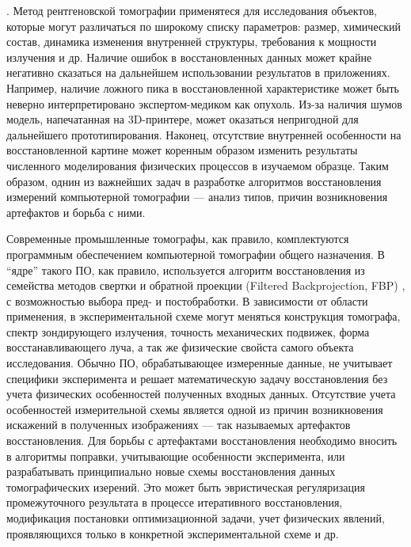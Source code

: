 {\actuality}. Метод рентгеновской томографии применятеся для исследования объектов, которые могут различаться по широкому списку параметров: размер, химический состав, динамика изменения внутренней структуры, требования к мощности излучения и др.
Наличие ошибок в восстановленных данных может крайне негативно сказаться на дальнейшем использовании результатов в приложениях.
Например, наличие ложного пика в восстановленной характеристике может быть неверно интерпретировано экспертом-медиком как опухоль.
Из-за наличия шумов модель, напечатанная на 3D-принтере, может оказаться непригодной для дальнейшего прототипирования.
Наконец, отсутствие внутренней особенности на восстановленной картине может коренным образом изменить результаты численного моделирования физических процессов в изучаемом образце.
Таким образом, однин из важнейших задач в разработке алгоритмов восстановления измерений компьютерной томографии --- анализ типов, причин возникновения артефактов и борьба с ними.

Современные промышленные томографы, как правило, комплектуются программным обеспечением компьютерной томографии общего назначения.
В ``ядре'' такого ПО, как правило, используется алгоритм восстановления из семейства методов свертки и обратной проекции (Filtered Backprojection, FBP) \cite{commercialCTemployFBP}, с возможностью выбора пред- и постобработки.
В зависимости от области применения, в экспериментальной схеме могут меняться конструкция томографа, спектр зондирующего излучения, точность механических подвижек, форма восстанавливающего луча, а так же физические свойста самого объекта исследования.
Обычно ПО, обрабатывающее измеренные данные, не учитывает специфики эксперимента и решает математическую задачу восстановления без учета физических особенностей полученных входных данных.
Отсутствие учета особенностей измерительной схемы является одной из причин возникновения искажений в полученных изображениях --- так называемых артефактов восстановления.
Для борьбы с артефактами восстановления необходимо вносить в алгоритмы поправки, учитывающие особенности эксперимента, или разрабатывать принципиально новые схемы восстановления данных томографических изерений.
Это может быть эвристическая регуляризация промежуточного результата в процессе итеративного восстановления, модификация постановки оптимизационной задачи, учет физических явлений, проявляющихся только в конкретной экспериментальной схеме и др.

